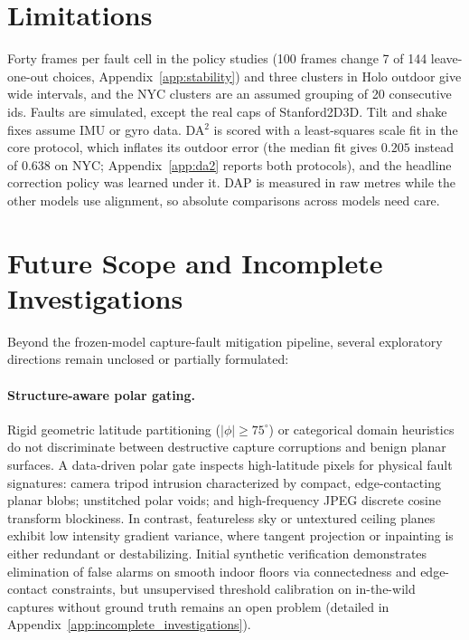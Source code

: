 \documentclass{article}
\begin{document}
\section{Limitations}
Forty frames per fault cell in the policy studies (100 frames change 7 of 144 leave-one-out choices, Appendix~\ref{app:stability}) and three clusters in Holo outdoor give wide intervals, and the NYC clusters are an assumed grouping of 20 consecutive ids. Faults are simulated, except the real caps of Stanford2D3D. Tilt and shake fixes assume IMU or gyro data. DA$^2$ is scored with a least-squares scale fit in the core protocol, which inflates its outdoor error (the median fit gives $0.205$ instead of $0.638$ on NYC; Appendix~\ref{app:da2} reports both protocols), and the headline correction policy was learned under it. DAP is measured in raw metres while the other models use alignment, so absolute comparisons across models need care.

\section{Future Scope and Incomplete Investigations}\label{sec:futurescope}
Beyond the frozen-model capture-fault mitigation pipeline, several exploratory directions remain unclosed or partially formulated:

\paragraph{Structure-aware polar gating.} Rigid geometric latitude partitioning ($|\phi| \ge 75^\circ$) or categorical domain heuristics do not discriminate between destructive capture corruptions and benign planar surfaces. A data-driven polar gate inspects high-latitude pixels for physical fault signatures: camera tripod intrusion characterized by compact, edge-contacting planar blobs; unstitched polar voids; and high-frequency JPEG discrete cosine transform blockiness. In contrast, featureless sky or untextured ceiling planes exhibit low intensity gradient variance, where tangent projection or inpainting is either redundant or destabilizing. Initial synthetic verification demonstrates elimination of false alarms on smooth indoor floors via connectedness and edge-contact constraints, but unsupervised threshold calibration on in-the-wild captures without ground truth remains an open problem (detailed in Appendix~\ref{app:incomplete_investigations}).
\end{document}
